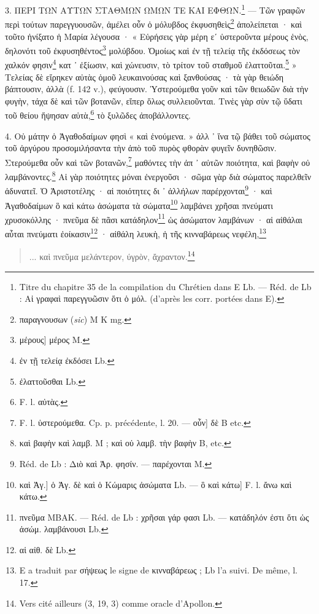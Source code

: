 \documentclass[a4paper, 11pt, oneside, polutonikogreek, french]{article}
\begin{document}
3. ΠΕΡΙ ΤΩΝ ΑΥΤΩΝ ΣΤΑΘΜΩΝ ΩΜΩΝ ΤΕ ΚΑΙ ΕΦΘΩΝ.\footnote{Titre du chapitre 35 de la compilation du Chrétien dans E Lb. --- Réd. de Lb : Αἱ γραφαὶ παρεγγυῶσιν ὅτι ὁ μόλ. (d'après les corr. portées dans E).} --- Τῶν γραφῶν περὶ τούτων παρεγγυουσῶν, ἀμέλει οὖν ὁ μόλυβδος ἐκφυσηθεὶς\footnote{παραγνουσων (\emph{sic}) M K mg.} ἀπολείπεται · καὶ τοῦτο ἠνίξατο ἡ Μαρία λέγουσα · « Εὑρήσεις γὰρ μέρη εʹ ὑστεροῦντα μέρους ἑνὸς, δηλονότι τοῦ ἐκφυσηθέντος\footnote{μέρους] μέρος M.} μολύβδου. Ὁμοίως καὶ ἐν τῇ τελείᾳ τῆς ἐκδόσεως τὸν χαλκόν φησιν\footnote{ἐν τῇ τελείᾳ ἐκδόσει Lb.} κατ ᾽ ἐξίωσιν, καὶ χώνευσιν, τὸ τρίτον τοῦ σταθμοῦ ἐλαττοῦται.\footnote{ἐλαττοῦσθαι Lb.} » Τελείας δὲ εἴρηκεν αὐτὰς ὁμοῦ λευκαινούσας καὶ ξανθούσας · τὰ γὰρ θειώδη βάπτουσιν, ἀλλὰ (f. 142 v.), φεύγουσιν. Ὑστερούμεθα γοῦν καὶ τῶν θειωδῶν διὰ τὴν φυγὴν, τάχα δὲ καὶ τῶν βοτανῶν, εἴπερ ὅλως συλλειοῦνται. Τινὲς γὰρ σὺν τῷ ὕδατι τοῦ θείου ἥψησαν αὐτὰ,\footnote{F. l. αὐτὰς.} τὸ ξυλῶδες ἀποβάλλοντες.

4. Οὐ μάτην ὁ Ἀγαθοδαίμων φησὶ « καὶ ἑνούμενα. » ἀλλ ᾽ ἵνα τῷ βάθει τοῦ σώματος τοῦ ἀργύρου προσομιλήσαντα τὴν ἀπὸ τοῦ πυρὸς φθορὰν φυγεῖν δυνηθῶσιν. Στερούμεθα οὖν καὶ τῶν βοτανῶν,\footnote{F. l. ὑστερούμεθα. Cp. p. précédente, l. 20. --- οὖν] δὲ B etc.} μαθόντες τὴν ἀπ ᾽ αὐτῶν ποιότητα, καὶ βαφὴν οὐ λαμβάνοντες.\footnote{καὶ βαφὴν καὶ λαμβ. M ; καὶ οὐ λαμβ. τὴν βαφὴν B, etc.} Αἱ γὰρ ποιότητες μόναι ἐνεργοῦσι · σῶμα γὰρ διὰ σώματος παρελθεῖν ἀδυνατεῖ. Ὁ Ἀριστοτέλης · αἱ ποιότητες δι ᾽ ἀλλήλων παρέρχονται\footnote{Réd. de Lb : Διὸ καὶ Ἀρ. φησίν. --- παρέχονται M.} · καὶ Ἀγαθοδαίμων ὃ καὶ κάτω ἀσώματα τὰ σώματα\footnote{καὶ Ἀγ.] ὁ Ἀγ. δὲ καὶ ὁ Κώμαρις ἀσώματα Lb. --- ὃ καὶ κάτω] F. l. ἄνω καὶ κάτω.} λαμβάνει χρῆσαι πνεύματι χρυσοκόλλης · πνεῦμα δὲ πᾶσι κατάδηλον\footnote{πνεῦμα MBAK. --- Réd. de Lb : χρῆσαι γάρ φασι Lb. --- κατάδηλόν ἐστι ὅτι ὡς ἀσώμ. λαμβάνουσι Lb.} ὡς ἀσώματον λαμβάνων · αἱ αἰθάλαι αὗται πνεύματι ἐοίκασιν\footnote{αἱ αἰθ. δὲ Lb.} · αἰθάλη λευκὴ, ἡ τῆς κινναβάρεως νεφέλη,\footnote{E a traduit par σήψεως le signe de κινναβάρεως ; Lb l'a suivi. De même, l. 17.}
\begin{quotation}
... καὶ πνεῦμα μελάντερον, ύγρὸν, ἄχραντον.\footnote{Vers cité ailleurs (3, 19, 3) comme oracle d'Apollon.}
\end{quotation}
\end{document}
